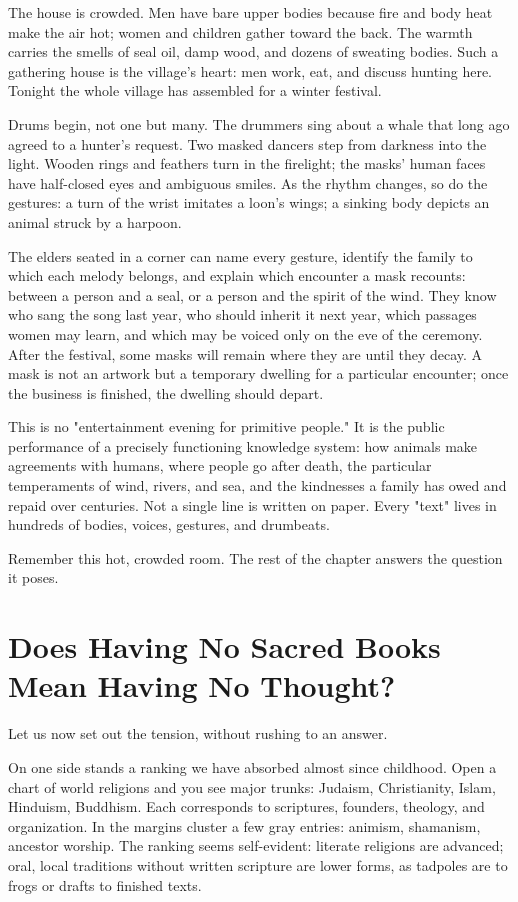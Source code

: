 The house is crowded. Men have bare upper bodies because fire and body heat make the air hot; women and children gather toward the back. The warmth carries the smells of seal oil, damp wood, and dozens of sweating bodies. Such a gathering house is the village's heart: men work, eat, and discuss hunting here. Tonight the whole village has assembled for a winter festival.

Drums begin, not one but many. The drummers sing about a whale that long ago agreed to a hunter's request. Two masked dancers step from darkness into the light. Wooden rings and feathers turn in the firelight; the masks' human faces have half-closed eyes and ambiguous smiles. As the rhythm changes, so do the gestures: a turn of the wrist imitates a loon's wings; a sinking body depicts an animal struck by a harpoon.

The elders seated in a corner can name every gesture, identify the family to which each melody belongs, and explain which encounter a mask recounts: between a person and a seal, or a person and the spirit of the wind. They know who sang the song last year, who should inherit it next year, which passages women may learn, and which may be voiced only on the eve of the ceremony. After the festival, some masks will remain where they are until they decay. A mask is not an artwork but a temporary dwelling for a particular encounter; once the business is finished, the dwelling should depart.

This is no "entertainment evening for primitive people." It is the public performance of a precisely functioning knowledge system: how animals make agreements with humans, where people go after death, the particular temperaments of wind, rivers, and sea, and the kindnesses a family has owed and repaid over centuries. Not a single line is written on paper. Every "text" lives in hundreds of bodies, voices, gestures, and drumbeats.

Remember this hot, crowded room. The rest of the chapter answers the question it poses.

\section[No Sacred Books, No Thought?]{Does Having No Sacred Books Mean Having No Thought?}
Let us now set out the tension, without rushing to an answer.

On one side stands a ranking we have absorbed almost since childhood. Open a chart of world religions and you see major trunks: Judaism, Christianity, Islam, Hinduism, Buddhism. Each corresponds to scriptures, founders, theology, and organization. In the margins cluster a few gray entries: animism, shamanism, ancestor worship. The ranking seems self-evident: literate religions are advanced; oral, local traditions without written scripture are lower forms, as tadpoles are to frogs or drafts to finished texts.

